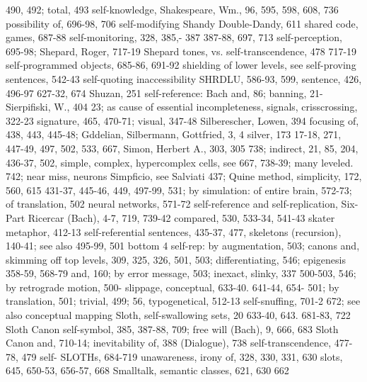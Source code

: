 490, 492; total, 493 self-knowledge,             Shakespeare, Wm., 96, 595, 598, 608, 736
possibility of, 696-98, 706 self-modifying       Shandy Double-Dandy, 611 shared code,
games, 687-88 self-monitoring, 328, 385,-        387
387-88, 697, 713 self-perception, 695-98;        Shepard, Roger, 717-19 Shepard tones,
vs. self-transcendence, 478                      717-19
self-programmed objects, 685-86, 691-92          shielding      of    lower     levels,  see
self-proving sentences, 542-43 self-quoting      inaccessibility SHRDLU, 586-93, 599,
sentence, 426, 496-97                            627-32, 674 Shuzan, 251
self-reference: Bach and, 86; banning, 21-       Sierpifiski, W., 404
23; as cause of essential incompleteness,        signals, crisscrossing, 322-23 signature,
465, 470-71;                                     visual, 347-48 Silberescher, Lowen, 394
focusing of, 438, 443, 445-48; Gddelian,         Silbermann, Gottfried, 3, 4 silver, 173
17-18, 271, 447-49, 497, 502, 533, 667,          Simon, Herbert A., 303, 305
738; indirect, 21, 85, 204, 436-37, 502,         simple, complex, hypercomplex cells, see
667, 738-39; many leveled. 742; near miss,       neurons Simpficio, see Salviati
437; Quine method,                               simplicity, 172, 560, 615
431-37, 445-46, 449, 497-99, 531; by             simulation: of entire brain, 572-73; of
translation, 502                                 neural networks, 571-72
self-reference     and       self-replication,   Six-Part Ricercar (Bach), 4-7, 719, 739-42
compared, 530, 533-34, 541-43                    skater metaphor, 412-13
self-referential sentences, 435-37, 477,         skeletons (recursion), 140-41; see also
495-99, 501                                      bottom 4
self-rep: by augmentation, 503; canons and,      skimming off top levels, 309, 325, 326,
501, 503; differentiating, 546; epigenesis       358-59, 568-79
and, 160; by error message, 503; inexact,        slinky, 337
500-503, 546; by retrograde motion, 500-         slippage, conceptual, 633-40. 641-44, 654-
501; by translation, 501; trivial, 499;          56,
typogenetical, 512-13 self-snuffing, 701-2       672; see also conceptual mapping Sloth,
self-swallowing sets, 20                         633-40, 643. 681-83, 722 Sloth Canon
self-symbol, 385, 387-88, 709; free will         (Bach), 9, 666, 683 Sloth Canon
and, 710-14; inevitability of, 388               (Dialogue), 738
self-transcendence, 477-78, 479 self-            SLOTHs, 684-719
unawareness, irony of, 328, 330, 331, 630        slots, 645, 650-53, 656-57, 668 Smalltalk,
semantic classes, 621, 630                       662
